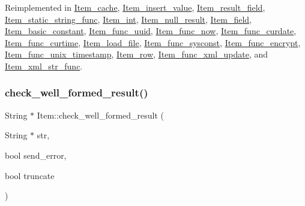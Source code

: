 Reimplemented in \mbox{\hyperlink{classItem__cache_ae62bc37e1839d9749fdd70c485506c5f}{Item\+\_\+cache}}, \mbox{\hyperlink{classItem__insert__value_a6c64934ac5862b0e211f15e347a0a940}{Item\+\_\+insert\+\_\+value}}, \mbox{\hyperlink{classItem__result__field_a12324702e7f419b47de45e3505730441}{Item\+\_\+result\+\_\+field}}, \mbox{\hyperlink{classItem__static__string__func_affbcad090aae0059272342f77d51ae90}{Item\+\_\+static\+\_\+string\+\_\+func}}, \mbox{\hyperlink{classItem__int_ae1ea6b10f3987835fc6d7ec45bb11f94}{Item\+\_\+int}}, \mbox{\hyperlink{classItem__null__result_a2e623724f3729cea2a1b54c3d5f7dbd4}{Item\+\_\+null\+\_\+result}}, \mbox{\hyperlink{classItem__field_a9a5288fcbc34ac4bda07a8e11c86269c}{Item\+\_\+field}}, \mbox{\hyperlink{classItem__basic__constant_a6240f3253090d2fc91f87a7a1cb773a7}{Item\+\_\+basic\+\_\+constant}}, \mbox{\hyperlink{classItem__func__uuid_a2ffae007bf0712dd82926ee1a994dc70}{Item\+\_\+func\+\_\+uuid}}, \mbox{\hyperlink{classItem__func__now_a724c78088a5de2c85cab8d92f0f8a519}{Item\+\_\+func\+\_\+now}}, \mbox{\hyperlink{classItem__func__curdate_abdf88efdcbd4bf821e4577dcd7765bb9}{Item\+\_\+func\+\_\+curdate}}, \mbox{\hyperlink{classItem__func__curtime_af861f93c4face56168852e5cdb465e43}{Item\+\_\+func\+\_\+curtime}}, \mbox{\hyperlink{classItem__load__file_a1be538400bc26d5fd2f1ee075bb11be5}{Item\+\_\+load\+\_\+file}}, \mbox{\hyperlink{classItem__func__sysconst_afef78b3a992b62b9c1155e0074e8ab72}{Item\+\_\+func\+\_\+sysconst}}, \mbox{\hyperlink{classItem__func__encrypt_a8b948c531a8265980a7be6913f3fe36c}{Item\+\_\+func\+\_\+encrypt}}, \mbox{\hyperlink{classItem__func__unix__timestamp_a326e598d47a54d35b5853e2b121894c2}{Item\+\_\+func\+\_\+unix\+\_\+timestamp}}, \mbox{\hyperlink{classItem__row_abaff5b82ee17b24e4a5d24a3c71b29b4}{Item\+\_\+row}}, \mbox{\hyperlink{classItem__func__xml__update_aef4d74587e25de0b32a863ecc3b27214}{Item\+\_\+func\+\_\+xml\+\_\+update}}, and \mbox{\hyperlink{classItem__xml__str__func_aad586261f128e8819704b29bdf0c0470}{Item\+\_\+xml\+\_\+str\+\_\+func}}.

\mbox{\label{classItem_ad28a9d3b48dd6e838b709d03b85f7eb1}} 
\subsubsection{\texorpdfstring{check\+\_\+well\+\_\+formed\+\_\+result()}{check\_well\_formed\_result()}}
{\footnotesize\ttfamily String $\ast$ Item\+::check\+\_\+well\+\_\+formed\+\_\+result (\begin{DoxyParamCaption}\item[{String $\ast$}]{str,  }\item[{bool}]{send\+\_\+error,  }\item[{bool}]{truncate }\end{DoxyParamCaption})}

